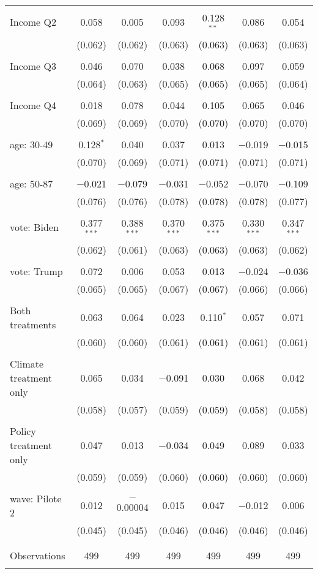 \begin{tabular}{@{\extracolsep{5pt}}lcccccc}
  & & & & & & \\ 
 Income Q2 & 0.058 & 0.005 & 0.093 & 0.128$^{**}$ & 0.086 & 0.054 \\ 
  & (0.062) & (0.062) & (0.063) & (0.063) & (0.063) & (0.063) \\ 
  & & & & & & \\ 
 Income Q3 & 0.046 & 0.070 & 0.038 & 0.068 & 0.097 & 0.059 \\ 
  & (0.064) & (0.063) & (0.065) & (0.065) & (0.065) & (0.064) \\ 
  & & & & & & \\ 
 Income Q4 & 0.018 & 0.078 & 0.044 & 0.105 & 0.065 & 0.046 \\ 
  & (0.069) & (0.069) & (0.070) & (0.070) & (0.070) & (0.070) \\ 
  & & & & & & \\ 
 age: 30-49 & 0.128$^{*}$ & 0.040 & 0.037 & 0.013 & $-$0.019 & $-$0.015 \\ 
  & (0.070) & (0.069) & (0.071) & (0.071) & (0.071) & (0.071) \\ 
  & & & & & & \\ 
 age: 50-87 & $-$0.021 & $-$0.079 & $-$0.031 & $-$0.052 & $-$0.070 & $-$0.109 \\ 
  & (0.076) & (0.076) & (0.078) & (0.078) & (0.078) & (0.077) \\ 
  & & & & & & \\ 
 vote: Biden & 0.377$^{***}$ & 0.388$^{***}$ & 0.370$^{***}$ & 0.375$^{***}$ & 0.330$^{***}$ & 0.347$^{***}$ \\ 
  & (0.062) & (0.061) & (0.063) & (0.063) & (0.063) & (0.062) \\ 
  & & & & & & \\ 
 vote: Trump & 0.072 & 0.006 & 0.053 & 0.013 & $-$0.024 & $-$0.036 \\ 
  & (0.065) & (0.065) & (0.067) & (0.067) & (0.066) & (0.066) \\ 
  & & & & & & \\ 
 Both treatments & 0.063 & 0.064 & 0.023 & 0.110$^{*}$ & 0.057 & 0.071 \\ 
  & (0.060) & (0.060) & (0.061) & (0.061) & (0.061) & (0.061) \\ 
  & & & & & & \\ 
 Climate treatment only & 0.065 & 0.034 & $-$0.091 & 0.030 & 0.068 & 0.042 \\ 
  & (0.058) & (0.057) & (0.059) & (0.059) & (0.058) & (0.058) \\ 
  & & & & & & \\ 
 Policy treatment only & 0.047 & 0.013 & $-$0.034 & 0.049 & 0.089 & 0.033 \\ 
  & (0.059) & (0.059) & (0.060) & (0.060) & (0.060) & (0.060) \\ 
  & & & & & & \\ 
 wave: Pilote 2 & 0.012 & $-$0.00004 & 0.015 & 0.047 & $-$0.012 & 0.006 \\ 
  & (0.045) & (0.045) & (0.046) & (0.046) & (0.046) & (0.046) \\ 
  & & & & & & \\ 
\hline \\[-1.8ex] 

Observations & 499 & 499 & 499 & 499 & 499 & 499 \\ 
\hline 
\hline \\[-1.8ex] 
\end{tabular} 